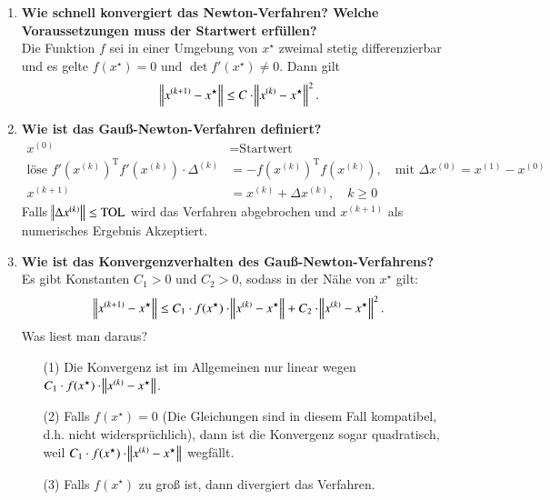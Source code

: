 \begin{enumerate}
		\item \textbf{Wie schnell konvergiert das Newton-Verfahren? Welche Voraussetzungen muss der Startwert erfüllen?} \\
			Die Funktion \(f\) sei in einer Umgebung von \(x^\star\) zweimal stetig differenzierbar und es gelte \(f(x^\star) =0\) und \(\det f'(x^\star)\neq 0\). Dann gilt
			\begin{align*}
				\norm{x^{(k+1)}-x^\star}\leq C\cdot \norm{x^{(k)}-x^\star}^2.
			\end{align*}
		
		\item \textbf{Wie ist das Gauß-Newton-Verfahren definiert?}
			\begin{align*}
			x^{(0)} &= \text{Startwert} \\
			\text{löse } f'(x^{(k)})^\text{T}f'(x^{(k)}) \cdot \Delta^{(k)} &= -f(x^{(k)})^\text{T}f(x^{(k)}), \quad \text{mit } \Delta x^{(0)}=x^{(1)}-x^{(0)} \\
			x^{(k+1)} &= x^{(k)} +  \Delta x^{(k)}, \quad k\geq 0
			\end{align*}
			Falls \(\norm{\Delta x^{(k)}}\leq\text{TOL} \) wird das Verfahren abgebrochen und \(x^{(k+1)}\) als numerisches Ergebnis Akzeptiert.
		
		\item \textbf{Wie ist das Konvergenzverhalten des Gauß-Newton-Verfahrens?} \\
			Es gibt Konstanten \(C_1>0\) und \(C_2>0\), sodass in der Nähe von \(x^\star\) gilt:
			\begin{align*}
				\norm{x^{(k+1)}-x^\star}\leq C_1\cdot f(x^\star)\cdot \norm{x^{(k)}-x^\star} + C_2\cdot \norm{x^{(k)}-x^\star}^2.
			\end{align*}
			Was liest man daraus?
			\begin{enumerate}
				\item[(1)] Die Konvergenz ist im Allgemeinen nur linear wegen \(C_1\cdot f(x^\star)\cdot \norm{x^{(k)}-x^\star}\).
				\item[(2)] Falls \(f(x^\star)=0\) (Die Gleichungen sind in diesem Fall kompatibel, d.h. nicht widersprüchlich), dann ist die Konvergenz sogar quadratisch, weil \(C_1\cdot f(x^\star)\cdot \norm{x^{(k)}-x^\star}\) wegfällt.
				\item[(3)] Falls \(f(x^\star)\) zu groß ist, dann divergiert das Verfahren.
			\end{enumerate}
		
	\end{enumerate}